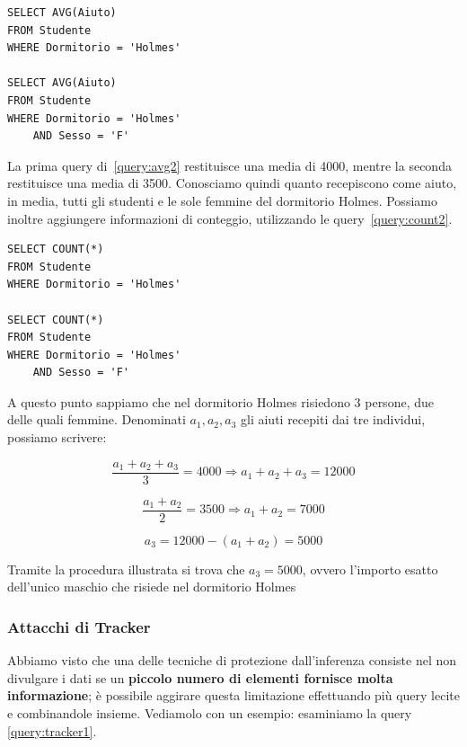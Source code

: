 \begin{algorithm}
\begin{lstlisting}[caption={Query di Media per ottenere informazioni sugli studenti del dormitorio Holmes \label{query:avg2}}] 
SELECT AVG(Aiuto)
FROM Studente
WHERE Dormitorio = 'Holmes'

SELECT AVG(Aiuto)
FROM Studente
WHERE Dormitorio = 'Holmes'
	AND Sesso = 'F'
\end{lstlisting}
\end{algorithm}

La prima query di~\ref{query:avg2} restituisce una media di 4000, mentre la seconda restituisce una media di 3500. Conosciamo quindi quanto recepiscono come aiuto, in media, tutti gli studenti e le sole femmine del dormitorio Holmes. Possiamo inoltre aggiungere informazioni di conteggio, utilizzando le query~\ref{query:count2}.

\begin{algorithm}
\begin{lstlisting}[caption={Query di conteggio per ottenere informazioni sugli studenti del dormitorio Holmes \label{query:count2}}]
SELECT COUNT(*)
FROM Studente
WHERE Dormitorio = 'Holmes'

SELECT COUNT(*)
FROM Studente
WHERE Dormitorio = 'Holmes'
	AND Sesso = 'F'
\end{lstlisting}
\end{algorithm}

A questo punto sappiamo che nel dormitorio Holmes risiedono 3 persone, due delle quali femmine. Denominati $a_1,a_2,a_3$ gli aiuti recepiti dai tre individui, possiamo scrivere:

\begin{equation}
\frac{a_1 + a_2 + a_3}{3} = 4000 \Rightarrow a_1 + a_2 + a_3 = 12000
\end{equation}

\begin{equation}
\frac{a_1 + a_2}{2} = 3500 \Rightarrow a_1 + a_2 = 7000
\end{equation}

\begin{equation}
 a_3 = 12000 - (a_1 + a_2) = 5000
\end{equation}

Tramite la procedura illustrata si trova che $ a_{3} = 5000 $, ovvero l'importo esatto dell'unico maschio che risiede nel dormitorio Holmes

\subsubsection{Attacchi di Tracker}
Abbiamo visto che una delle tecniche di protezione dall'inferenza consiste nel non divulgare i dati se un \textbf{piccolo numero di elementi fornisce molta informazione}; è possibile aggirare questa limitazione effettuando più query lecite e combinandole insieme. Vediamolo con un esempio: esaminiamo la query \ref{query:tracker1}.

